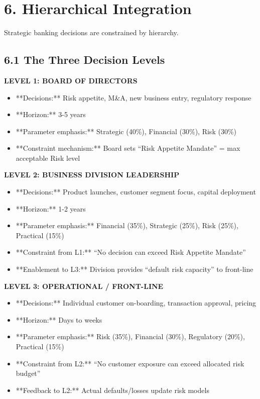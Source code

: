 \documentclass[11pt]{article}
\begin{document}
\section{6. Hierarchical Integration}

Strategic banking decisions are constrained by hierarchy.

\subsection{6.1 The Three Decision Levels}

\textbf{LEVEL 1: BOARD OF DIRECTORS}
\begin{itemize}
\item **Decisions:** Risk appetite, M\&A, new business entry, regulatory response
\item **Horizon:** 3-5 years
\item **Parameter emphasis:** Strategic (40\%), Financial (30\%), Risk (30\%)
\item **Constraint mechanism:** Board sets ``Risk Appetite Mandate'' = max acceptable Risk level
\end{itemize}

\textbf{LEVEL 2: BUSINESS DIVISION LEADERSHIP}
\begin{itemize}
\item **Decisions:** Product launches, customer segment focus, capital deployment
\item **Horizon:** 1-2 years
\item **Parameter emphasis:** Financial (35\%), Strategic (25\%), Risk (25\%), Practical (15\%)
\item **Constraint from L1:** ``No decision can exceed Risk Appetite Mandate''
\item **Enablement to L3:** Division provides ``default risk capacity'' to front-line
\end{itemize}

\textbf{LEVEL 3: OPERATIONAL / FRONT-LINE}
\begin{itemize}
\item **Decisions:** Individual customer on-boarding, transaction approval, pricing
\item **Horizon:** Days to weeks
\item **Parameter emphasis:** Risk (35\%), Financial (30\%), Regulatory (20\%), Practical (15\%)
\item **Constraint from L2:** ``No customer exposure can exceed allocated risk budget''
\item **Feedback to L2:** Actual defaults/losses update risk models
\end{itemize}
\end{document}
